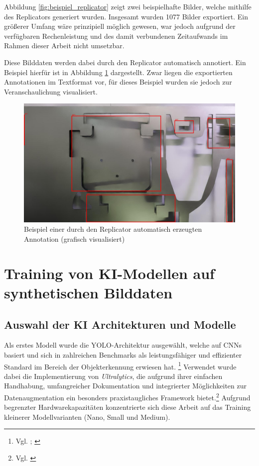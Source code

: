 Abbildung \ref{fig:beispiel_replicator} zeigt zwei beispielhafte Bilder, welche mithilfe des Replicators generiert wurden. Insgesamt wurden 1077 Bilder exportiert. Ein größerer Umfang wäre prinzipiell möglich gewesen, war jedoch aufgrund der verfügbaren Rechenleistung und des damit verbundenen Zeitaufwands im Rahmen dieser Arbeit nicht umsetzbar. 

Diese Bilddaten werden dabei durch den Replicator automatisch annotiert. Ein Beispiel hierfür ist in Abbildung \ref{fig:replicator_annotationen} dargestellt. Zwar liegen die exportierten Annotationen im Textformat vor, für dieses Beispiel wurden sie jedoch zur Veranschaulichung visualisiert.

\begin{figure}[htb]
    \centering
    \includegraphics[width=0.9\linewidth]{graphics/example_synthetic_images/Beispiel_Annotation.jpg}
    \caption{Beispiel einer durch den Replicator automatisch erzeugten Annotation (grafisch visualisiert)}
    \label{fig:replicator_annotationen}
\end{figure}


\section[Training von KI-Modellen auf synthetischen Bilddaten]{Training von \ac{KI}-Modellen auf synthetischen Bilddaten}

\subsection{Auswahl der KI Architekturen und Modelle}
Als erstes Modell wurde die \ac{YOLO}-Architektur ausgewählt, welche auf \acp{CNN} basiert und sich in zahlreichen Benchmarks als leistungsfähiger und effizienter Standard im Bereich der Objekterkennung erwiesen hat. \footnote{Vgl. \cite[771]{monnet_investigating_2024}; \cite{bilous_comparison_2024}}
Verwendet wurde dabei die Implementierung von \textit{Ultralytics}, die aufgrund ihrer einfachen Handhabung, umfangreicher Dokumentation und integrierter Möglichkeiten zur Datenaugmentation ein besonders praxistaugliches Framework bietet.\footnote{Vgl. \cite{yolo11_ultralytics}}
Aufgrund begrenzter Hardwarekapazitäten konzentrierte sich diese Arbeit auf das Training kleinerer Modellvarianten (Nano, Small und Medium).

